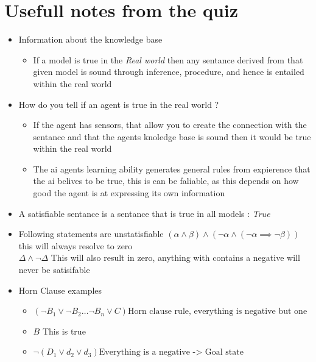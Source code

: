 \documentclass{article}
\theoremstyle{mytheoremstyle}
\theoremstyle{mytheoremstyle}
\theoremstyle{myproblemstyle}
\begin{document}
\section{Usefull notes from the quiz}
\begin{itemize}
	\item Information about the knowledge base
	      \begin{itemize}
		      \item If a model is true in the \textit{Real world} then any sentance derived from that given model is sound through inference, procedure, and hence is entailed within the real world
	      \end{itemize}
	\item How do you tell if an agent is true in the real world ?
	      \begin{itemize}
		      \item If the agent has sensors, that allow you to create the connection with the sentance and that the agents knoledge base is sound then it would be true within the real world
		      \item The ai agents learning ability generates general rules from expierence that the ai belives to be true, this is can be faliable, as this depends on how good the agent is at expressing its own information

	      \end{itemize}
	\item A satisfiable sentance is a sentance that is true in all models : \textit{True}
	\item Following statements are unstatisfiable
	      \begin{math}
		      (\alpha  \land  \beta ) \land (\neg \alpha  \land (\neg \alpha \implies \neg \beta ))
	      \end{math}
	      this will always resolve to zero
	      \\
	      \begin{math}
		      \Delta  \land  \neg \Delta
	      \end{math}
	      This will also result in zero, anything with contains a negative will never be satisifable
	\item Horn Clause examples
	      \begin{itemize}
		      \item \begin{math}
			            (\neg B_1 \lor \neg B_2 \ldots \neg B_n \lor C)
			            \text{Horn clause rule, everything is negative but one}
		            \end{math}
		      \item \begin{math}
			            B
		            \end{math}
		            This is true
		      \item \begin{math}
			            \neg (D_1 \lor  d_2 \lor  d_3)
			            \text{Everything is a negative ->  Goal state}
		            \end{math}


\end{itemize}
\end{itemize}
\end{document}
